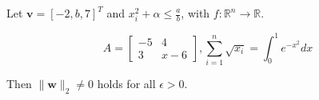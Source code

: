 Let \(\mathbf{v} = [-2, b, 7]^T\) and \(x_i^2 + \alpha \leq \frac{a}{b}\), with \(f : \mathbb{R}^n \to \mathbb{R}\).

\[
A = \begin{bmatrix}
-5 & 4 \\
3 & x - 6
\end{bmatrix}, \sum_{i=1}^n \sqrt{x_i} = \int_0^1 e^{-x^2} dx
\]

Then \(\|\mathbf{w}\|_2 \neq 0\) holds for all \(\epsilon > 0\).
